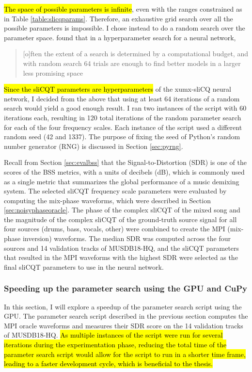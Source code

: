 \documentclass[report.tex]{subfiles}
\begin{document}
\hl{The space of possible parameters is infinite}, even with the ranges constrained as in Table \ref{table:slicqparams}. Therefore, an exhaustive grid search over all the possible parameters is impossible. I chose instead to do a random search over the parameter space. \textcite{randomgrid} found that in a hyperparameter search for a neural network,

\begin{quote}
	[o]ften the extent of a search is determined by a computational budget, and with random search 64 trials are enough to find better models in a larger less promising space \parencite[293]{randomgrid}
\end{quote}

\hl{Since the sliCQT parameters are hyperparameters} of the xumx-sliCQ neural network, I decided from the above that using at least 64 iterations of a random search would yield a good enough result. I ran two instances of the script with 60 iterations each, resulting in 120 total iterations of the random parameter search for each of the four frequency scales. Each instance of the script used a different random seed (42 and 1337). The purpose of fixing the seed of Python's random number generator (RNG) is discussed in Section \ref{sec:pyrng}.

Recall from Section \ref{sec:evalbss} that the Signal-to-Distortion (SDR) is one of the scores of the BSS metrics, with a units of decibels (dB), which is commonly used as a single metric that summarizes the global performance of a music demixing system. The selected sliCQT frequency scale parameters were evaluated by computing the mix-phase waveforms, which were described in Section \ref{sec:noisyphaseoracle}. The phase of the complex sliCQT of the mixed song and the magnitude of the complex sliCQT of the ground-truth source signal for all four sources (drums, bass, vocals, other) were combined to create the MPI (mix-phase inversion) waveforms. The median SDR was computed across the four sources and 14 validation tracks of MUSDB18-HQ, and the sliCQT parameters that resulted in the MPI waveforms with the highest SDR were selected as the final sliCQT parameters to use in the neural network.

\subsubsection{Speeding up the parameter search using the GPU and CuPy}
\label{sec:fasterbsscupy}

In this section, I will explore a speedup of the parameter search script using the GPU.  The parameter search script described in the previous section computes the MPI oracle waveforms and measures their SDR score on the 14 validation tracks of MUSDB18-HQ. \hl{As multiple instances of the script were run for several iterations during the experimentation phase, reducing the total time of the parameter search script would allow for the script to run in a shorter time frame, leading to a faster development cycle, which is beneficial to the thesis.}
\end{document}
